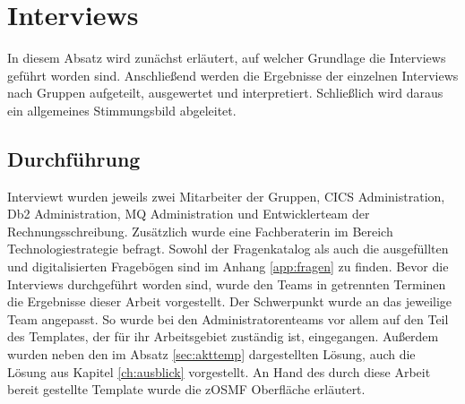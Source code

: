 \section{Interviews}
In diesem Absatz wird zunächst erläutert, auf welcher Grundlage die Interviews geführt worden sind.
Anschließend werden die Ergebnisse der einzelnen Interviews nach Gruppen aufgeteilt, ausgewertet und interpretiert.
Schließlich wird daraus ein allgemeines Stimmungsbild abgeleitet.

\subsection{Durchführung}
Interviewt wurden jeweils zwei Mitarbeiter der Gruppen, CICS Administration, Db2 Administration, MQ Administration und Entwicklerteam der Rechnungsschreibung.
Zusätzlich wurde eine Fachberaterin im Bereich Technologiestrategie befragt.
Sowohl der Fragenkatalog als auch die ausgefüllten und digitalisierten Fragebögen sind im Anhang \ref{app:fragen} zu finden.
Bevor die Interviews durchgeführt worden sind, wurde den Teams in getrennten Terminen die Ergebnisse dieser Arbeit vorgestellt.
Der Schwerpunkt wurde an das jeweilige Team angepasst.
So wurde bei den Administratorenteams vor allem auf den Teil des Templates, der für ihr Arbeitsgebiet zuständig ist, eingegangen.
Außerdem wurden neben den im Absatz \ref{sec:akttemp} dargestellten Lösung, auch die Lösung aus Kapitel \ref{ch:ausblick} vorgestellt.
An Hand des durch diese Arbeit bereit gestellte Template wurde die zOSMF Oberfläche erläutert.

